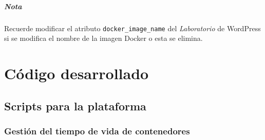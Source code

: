             \paragraph{Nota}

                Recuerde modificar el atributo \texttt{docker\_image\_name} del \textit{Laboratorio} de WordPress si se modifica el nombre de la imagen Docker o esta se elimina.

                \cleardoublepage

            

\chapter{Código desarrollado}

    \section{Scripts para la plataforma}

        \subsection{Gestión del tiempo de vida de contenedores}
            
